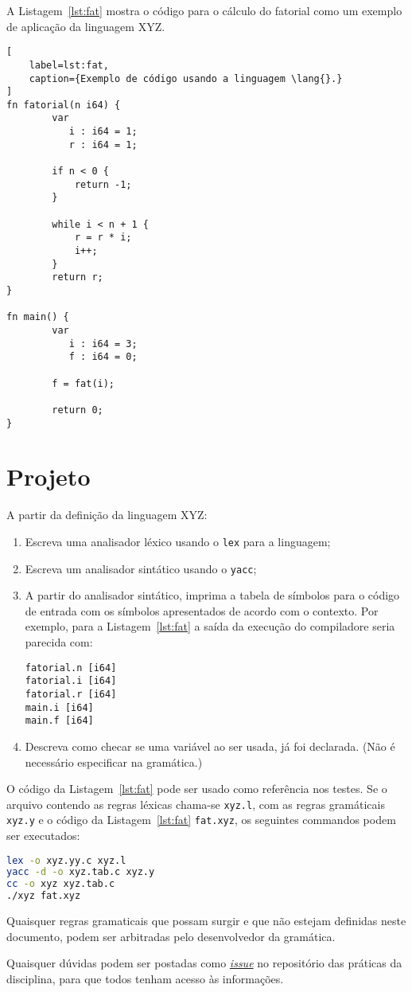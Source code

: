 \documentclass{article}
\def\lang{{\sc XYZ}}
\begin{document}
\pagebreak
A Listagem~\ref{lst:fat} mostra o código para o cálculo 
do fatorial como um exemplo de aplicação da linguagem 
\lang.

\begin{lstlisting}[
    label=lst:fat,
    caption={Exemplo de código usando a linguagem \lang{}.}
]
fn fatorial(n i64) {
        var
           i : i64 = 1;
           r : i64 = 1;
    
        if n < 0 {
            return -1;
        }

        while i < n + 1 {
            r = r * i;
            i++;
        }
        return r;
}
    
fn main() {
        var 
           i : i64 = 3;
           f : i64 = 0;
    
        f = fat(i);

        return 0;
}
\end{lstlisting}

\section*{Projeto}

A partir da definição da linguagem \lang:

\begin{enumerate}
\item Escreva uma analisador léxico usando o {\tt lex} 
para a linguagem;
\item Escreva um analisador sintático usando o {\tt yacc};
\item A partir do analisador sintático, imprima a tabela de 
símbolos para o código de entrada com os símbolos apresentados 
de acordo com o contexto. Por exemplo, para a Listagem~\ref{lst:fat}
a saída da execução do compiladore seria parecida com:

\begin{verbatim}
fatorial.n [i64]
fatorial.i [i64]
fatorial.r [i64]
main.i [i64]
main.f [i64]
\end{verbatim}

\item Descreva como checar se uma variável ao ser usada, já foi
  declarada. (Não é necessário especificar na gramática.)
\end{enumerate}

O código da Listagem~\ref{lst:fat} pode ser usado como referência
nos testes. Se o arquivo contendo as regras léxicas chama-se 
{\tt xyz.l}, com as regras gramáticais {\tt xyz.y} e o 
código da Listagem~\ref{lst:fat} {\tt fat.xyz}, os seguintes 
commandos podem ser executados:

\begin{lstlisting}[language=bash]
lex -o xyz.yy.c xyz.l
yacc -d -o xyz.tab.c xyz.y
cc -o xyz xyz.tab.c
./xyz fat.xyz
\end{lstlisting}

Quaisquer regras gramaticais que possam surgir 
e que não estejam definidas neste documento,
podem ser arbitradas pelo desenvolvedor da
gramática.

Quaisquer dúvidas podem ser postadas como 
\href{https://github.com/ajholanda/edu-compiladores/issues}{{\it issue}}
no repositório das práticas da disciplina, para que todos
tenham acesso às informações.
\end{document}

